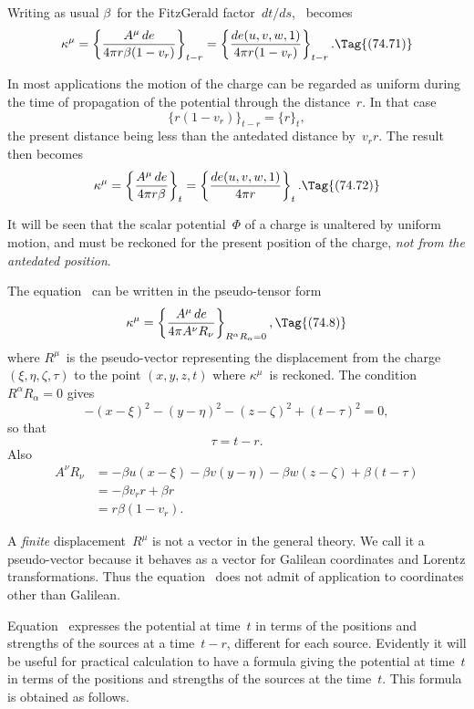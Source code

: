 \documentclass[12pt]{book}
\begin{document}
Writing as usual $\beta$~for the FitzGerald factor~$dt/ds$, ~becomes
\[
\kappa^{\mu} = \left\{\frac{A^{\mu}\, de}{4\pi r\beta(1 - v_{r})}\right\}_{t-r}
= \left\{\frac{de(u, v, w, 1)}{4\pi r(1 - v_{r})}\right\}_{t-r}.
\Tag{(74.71)}
\]

In most applications the motion of the charge can be regarded as uniform
during the time of propagation of the potential through the distance~$r$. In
that case
\[
\{r(1 - v_{r})\}_{t-r} = \{r\}_{t},
\]
the present distance being less than the antedated distance by~$v_{r} r$. The result
then becomes
\[
\kappa^{\mu} = \left\{\frac{A^{\mu}\, de}{4\pi r\beta}\right\}_{t}
= \left\{\frac{de(u, v, w, 1)}{4\pi r}\right\}_{t}.
\Tag{(74.72)}
\]

It will be seen that the scalar potential~$\Phi$ of a charge is unaltered by
uniform motion, and must be reckoned for the present position of the charge,
\emph{not from the antedated position}.

The equation~ can be written in the pseudo-tensor form
\[
\kappa^{\mu} = \left\{\frac{A^{\mu}\, de}{4\pi A^{\nu}R_{\nu}}\right\}_{R^{\alpha}R_{\alpha}=0},
\Tag{(74.8)}
\]
where $R^{\mu}$~is the pseudo-vector representing the displacement from the charge
%
$(\xi, \eta, \zeta, \tau)$ to the point $(x, y, z, t)$ where $\kappa^{\mu}$~is reckoned. The condition
$R^{\alpha}R_{\alpha} = 0$ gives
\[
-(x - \xi)^{2} - (y - \eta)^{2} - (z - \zeta)^{2} + (t - \tau)^{2} = 0,
\]
so that
\[
\tau = t - r.
\]
Also
\begin{align*}
  A^{\nu} R_{\nu}
  &= -\beta u(x - \xi) - \beta v(y - \eta) - \beta w(z - \zeta) + \beta(t - \tau) \\
  &= -\beta v_{r} r + \beta r \\
  &= r\beta(1 - v_{r}).
\end{align*}

A \emph{finite} displacement~$R^{\mu}$ is not a vector in the general theory. We call it
a pseudo-vector because it behaves as a vector for Galilean coordinates and
Lorentz transformations. Thus the equation~ does not admit of application
to coordinates other than Galilean.

Equation~ expresses the potential at time~$t$ in terms of the positions and strengths of the sources
at a time~$t-r$, different for each source.
Evidently it will be useful for practical calculation to have a formula giving the potential at time~$t$ in terms
of the positions and strengths of the sources at the time~$t$.
This formula is obtained as follows.
\end{document}
